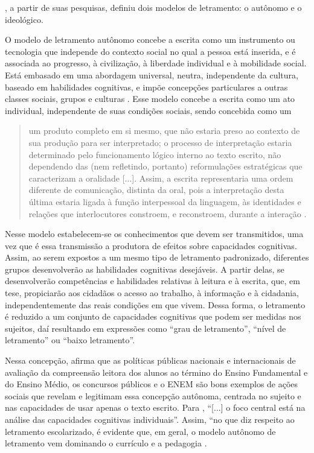 \documentclass{textolivre}
\begin{document}
\textcite{street2014}, a partir de suas pesquisas, definiu dois modelos de letramento:
o autônomo e o ideológico.

O modelo de letramento autônomo concebe a escrita como um instrumento ou
tecnologia que independe do contexto social no qual a pessoa está inserida, e é
associada ao progresso, à civilização, à liberdade individual e à mobilidade
social. Está embasado em uma abordagem universal, neutra, independente da
cultura, baseado em habilidades cognitivas, e impõe concepções particulares a
outras classes sociais, grupos e culturas \cite{street2014}. Esse modelo concebe a
escrita como um ato individual, independente de suas condições sociais, sendo
concebida como um
\begin{quote}
um produto completo em si mesmo, que não estaria preso ao contexto de sua
produção para ser interpretado; o processo de interpretação estaria determinado
pelo funcionamento lógico interno ao texto escrito, não dependendo das (nem
refletindo, portanto) reformulações estratégicas que caracterizam a oralidade [...]. Assim, a escrita representaria uma
ordem diferente de comunicação, distinta da oral, pois a interpretação desta
última estaria ligada à função interpessoal da linguagem, às identidades e
relações que interlocutores constroem, e reconstroem, durante a interação
\cite[p. 22]{kleiman2003}.
\end{quote}

Nesse modelo estabelecem-se os conhecimentos que devem ser transmitidos, uma
vez que é essa transmissão a produtora de efeitos sobre capacidades cognitivas.
Assim, ao serem expostos a um mesmo tipo de letramento padronizado, diferentes
grupos desenvolverão as habilidades cognitivas desejáveis. A partir delas, se
desenvolverão competências e habilidades relativas à leitura e à escrita, que, em
tese, propiciarão aos cidadãos o acesso ao trabalho, à informação e à
cidadania, independentemente das reais condições em que vivem. Dessa forma, o
letramento é reduzido a um conjunto de capacidades cognitivas que podem ser
medidas nos sujeitos, daí resultando em expressões como “grau de letramento”,
“nível de letramento” ou “baixo letramento”.

Nessa concepção, \textcite{street2014} afirma que as políticas públicas nacionais e
internacionais de avaliação da compreensão leitora dos alunos ao término do
Ensino Fundamental e do Ensino Médio, os concursos públicos e o ENEM são bons
exemplos de ações sociais que revelam e legitimam essa concepção autônoma,
centrada no sujeito e nas capacidades de usar apenas o texto escrito. Para
\textcite[p. 9]{street2014}, “[...] o foco central está na análise das capacidades
cognitivas individuais”. Assim, “no que diz respeito ao letramento
escolarizado, é evidente que, em geral, o modelo autônomo de letramento vem
dominando o currículo e a pedagogia \cite[p. 150]{street2009}.
\end{document}
